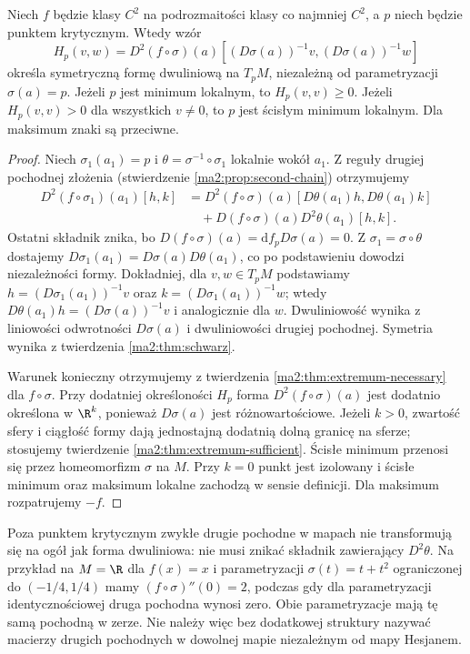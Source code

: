 \begin{twierdzenie}
\label{ma2:thm:critical-hessian-manifold}
Niech $f$ będzie klasy $C^2$ na podrozmaitości klasy
co najmniej $C^2$, a $p$ niech będzie punktem krytycznym.
Wtedy wzór
\[
 H_p(v,w)=D^2(f\circ\sigma)(a)
       [(D\sigma(a))^{-1}v,(D\sigma(a))^{-1}w]
\]
określa symetryczną formę dwuliniową na $T_pM$,
niezależną od parametryzacji $\sigma(a)=p$.
Jeżeli $p$ jest minimum lokalnym, to $H_p(v,v)\ge0$.
Jeżeli $H_p(v,v)>0$ dla wszystkich $v\ne0$, to $p$ jest
ścisłym minimum lokalnym. Dla maksimum znaki są przeciwne.
\end{twierdzenie}
\begin{proof}
Niech $\sigma_1(a_1)=p$ i
$\theta=\sigma^{-1}\circ\sigma_1$ lokalnie wokół $a_1$.
Z reguły drugiej pochodnej złożenia
(stwierdzenie \ref{ma2:prop:second-chain}) otrzymujemy
\[
 \begin{aligned}
 D^2(f\circ\sigma_1)(a_1)[h,k]
 &=
 D^2(f\circ\sigma)(a)[D\theta(a_1)h,D\theta(a_1)k]\\
 &\quad+D(f\circ\sigma)(a)D^2\theta(a_1)[h,k].
 \end{aligned}
\]
Ostatni składnik znika, bo
$D(f\circ\sigma)(a)=\mathrm df_p D\sigma(a)=0$.
Z $\sigma_1=\sigma\circ\theta$ dostajemy
$D\sigma_1(a_1)=D\sigma(a)D\theta(a_1)$, co po
podstawieniu dowodzi niezależności formy. Dokładniej,
dla $v,w\in T_pM$ podstawiamy
$h=(D\sigma_1(a_1))^{-1}v$ oraz
$k=(D\sigma_1(a_1))^{-1}w$; wtedy
$D\theta(a_1)h=(D\sigma(a))^{-1}v$ i analogicznie
dla $w$. Dwuliniowość wynika z liniowości odwrotności
$D\sigma(a)$ i dwuliniowości drugiej pochodnej.
Symetria wynika z twierdzenia \ref{ma2:thm:schwarz}.

Warunek konieczny otrzymujemy z
twierdzenia \ref{ma2:thm:extremum-necessary}
dla $f\circ\sigma$. Przy dodatniej określoności
$H_p$ forma $D^2(f\circ\sigma)(a)$ jest dodatnio określona
w $\R^k$, ponieważ $D\sigma(a)$ jest różnowartościowe.
Jeżeli $k>0$, zwartość sfery i ciągłość formy dają
jednostajną dodatnią dolną granicę na sferze; stosujemy
twierdzenie \ref{ma2:thm:extremum-sufficient}.
Ścisłe minimum przenosi się przez homeomorfizm
$\sigma$ na $M$. Przy $k=0$ punkt jest izolowany i
ścisłe minimum oraz maksimum lokalne zachodzą
w sensie definicji. Dla maksimum rozpatrujemy $-f$.
\end{proof}

Poza punktem krytycznym zwykłe drugie pochodne w mapach
nie transformują się na ogół jak forma dwuliniowa:
nie musi znikać składnik zawierający $D^2\theta$.
Na przykład na $M=\R$ dla $f(x)=x$ i parametryzacji
$\sigma(t)=t+t^2$ ograniczonej do $(-1/4,1/4)$
mamy $(f\circ\sigma)''(0)=2$, podczas gdy dla
parametryzacji identycznościowej druga pochodna wynosi
zero. Obie parametryzacje mają tę samą pochodną w zerze.
Nie należy więc bez dodatkowej struktury nazywać
macierzy drugich pochodnych w dowolnej mapie
niezależnym od mapy Hesjanem.

